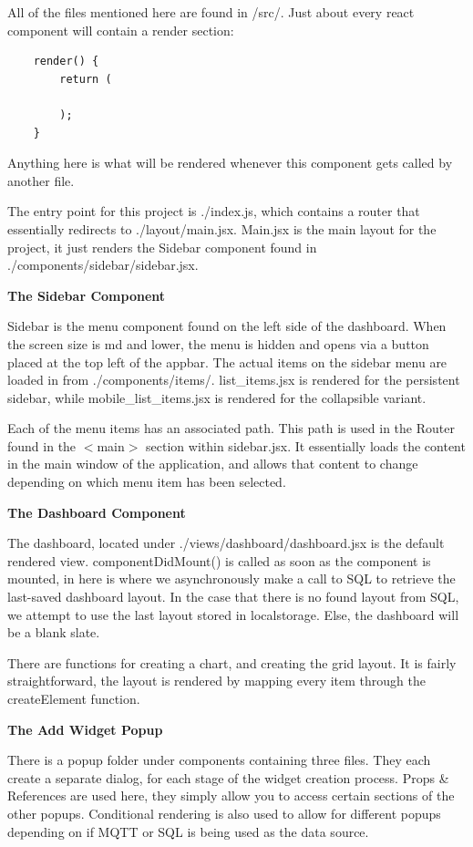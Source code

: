 \documentclass[12pt, titlepage]{article}
\begin{document}
All of the files mentioned here are found in /src/. Just about every react component will contain a render section: 
\begin{verbatim}
    render() {
        return (

        );
    }
\end{verbatim}
\noindent Anything here is what will be rendered whenever this component gets called by another file.  

\noindent The entry point for this project is ./index.js, which contains a router that essentially redirects to ./layout/main.jsx. Main.jsx is the main layout for the project, it just renders the Sidebar component found in ./components/sidebar/sidebar.jsx.

\textbf{The Sidebar Component}

\noindent Sidebar is the menu component found on the left side of the dashboard. When the screen size is md and lower, the menu is hidden and opens via a button placed at the top left of the appbar. The actual items on the sidebar menu are loaded in from ./components/items/. list\_items.jsx is rendered for the persistent sidebar, while mobile\_list\_items.jsx is rendered for the collapsible variant.

\noindent Each of the menu items has an associated path. This path is used in the Router found in the $<$main$>$ section within sidebar.jsx. It essentially loads the content in the main window of the application, and allows that content to change depending on which menu item has been selected.

\textbf{The Dashboard Component}

\noindent The dashboard, located under ./views/dashboard/dashboard.jsx is the default rendered view. componentDidMount() is called as soon as the component is mounted, in here is where we asynchronously make a call to SQL to retrieve the last-saved dashboard layout. In the case that there is no found layout from SQL, we attempt to use the last layout stored in localstorage. Else, the dashboard will be a blank slate.

\noindent There are functions for creating a chart, and creating the grid layout. It is fairly straightforward, the layout is rendered by mapping every item through the createElement function.  

\textbf{The Add Widget Popup}

\noindent There is a popup folder under components containing three files. They each create a separate dialog, for each stage of the widget creation process. Props \& References are used here, they simply allow you to access certain sections of the other popups. Conditional rendering is also used to allow for different popups depending on if MQTT or SQL is being used as the data source.
\end{document}
